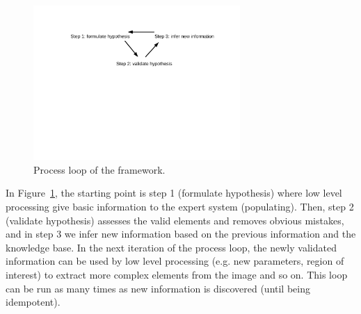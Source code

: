  \begin{figure}[!ht]  %
   \centering
  \includegraphics[trim= 140px 350px 100px 95px, clip, width=0.7\textwidth]{process_loop.pdf}
  \caption[Process loop of the knowledge-driven system]{Process loop of the framework.}
  \label{fig:kn:process_loop}
 \end{figure}

In Figure~\ref{fig:kn:process_loop}, the starting point is step 1 (formulate hypothesis) where low level processing give basic information to the expert system (populating).
Then, step 2 (validate hypothesis) assesses the valid elements and removes obvious mistakes, and in step 3 we infer new information based on the previous information and the knowledge base.
In the next iteration of the process loop, the newly validated information can be used by low level processing (e.g. new parameters, region of interest) to extract more complex elements from the image and so on.
This loop can be run as many times as new information is discovered (until being idempotent).




